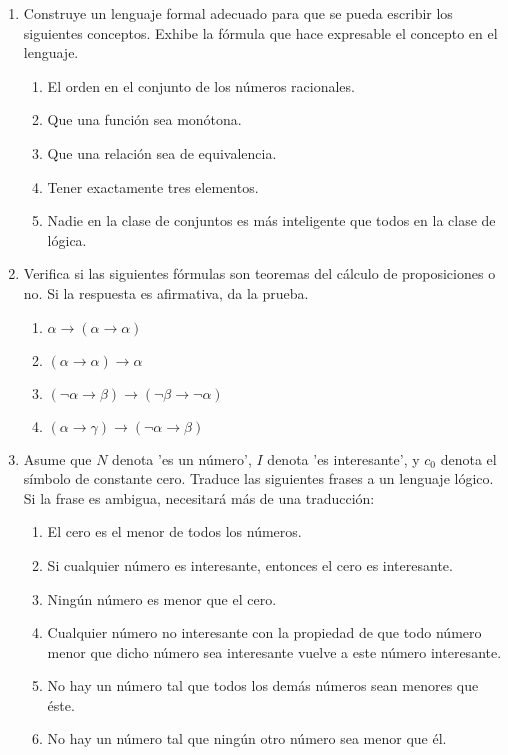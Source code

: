 \documentclass[11pt,answers]{exam}
\begin{document}


\begin{enumerate}
    \item Construye un lenguaje formal adecuado para que se pueda escribir los siguientes conceptos. Exhibe la fórmula que hace expresable el concepto en el lenguaje.
    \begin{enumerate}
        \item El orden en el conjunto de los números racionales.
        \item Que una función sea monótona.
        \item Que una relación sea de equivalencia.
        \item Tener exactamente tres elementos.
        \item Nadie en la clase de conjuntos es más inteligente que todos en la clase de lógica.
    \end{enumerate}

    
    
    \item Verifica si las siguientes fórmulas son teoremas del cálculo de proposiciones o no. Si la respuesta es afirmativa, da la prueba.
    \begin{enumerate}
        \item $\alpha \to (\alpha \to \alpha)$
        \item $(\alpha \to \alpha) \to \alpha$
        \item $(\neg \alpha \to \beta) \to (\neg \beta \to \neg \alpha)$
        \item $(\alpha \to \gamma) \to (\neg \alpha \to \beta)$
    \end{enumerate}

    
    
    \item Asume que $N$ denota ’es un número’, $I$ denota ’es interesante’, y $c_0$ denota el símbolo de constante cero. Traduce las siguientes frases a un lenguaje lógico. Si la frase es ambigua, necesitará más de una traducción:
    \begin{enumerate}
        \item El cero es el menor de todos los números.
        \item Si cualquier número es interesante, entonces el cero es interesante.
        \item Ningún número es menor que el cero.
        \item Cualquier número no interesante con la propiedad de que todo número menor que dicho número sea interesante vuelve a este número interesante.
        \item No hay un número tal que todos los demás números sean menores que éste.
        \item No hay un número tal que ningún otro número sea menor que él.
    \end{enumerate}


\end{enumerate}
\end{document}
